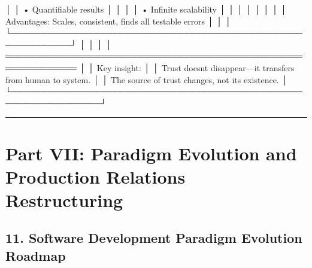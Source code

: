 \documentclass[
]{article}
\newenvironment{Shaded}{}{}
\newcommand{\NormalTok}[1]{#1}
\begin{document}
\begin{Shaded}
\begin{Highlighting}[]
\NormalTok{│  │              • Quantifiable results                        │ │}
\NormalTok{│  │              • Infinite scalability                        │ │}
\NormalTok{│  │                                                            │ │}
\NormalTok{│  │  Advantages: Scales, consistent, finds all testable errors │ │}
\NormalTok{│  └────────────────────────────────────────────────────────────┘ │}
\NormalTok{│                                                                  │}
\NormalTok{│  ══════════════════════════════════════════════════════════════  │}
\NormalTok{│  Key insight:                                                   │}
\NormalTok{│  Trust doesn\textquotesingle{}t disappear—it transfers from human to system.    │}
\NormalTok{│  The source of trust changes, not its existence.               │}
\NormalTok{└─────────────────────────────────────────────────────────────────┘}
\end{Highlighting}
\end{Shaded}

\begin{center}\rule{0.5\linewidth}{0.5pt}\end{center}

\hypertarget{part-vii-paradigm-evolution-and-production-relations-restructuring}{%
\section{Part VII: Paradigm Evolution and Production Relations
Restructuring}\label{part-vii-paradigm-evolution-and-production-relations-restructuring}}

\hypertarget{11-software-development-paradigm-evolution-roadmap}{%
\subsection{11. Software Development Paradigm Evolution
Roadmap}\label{11-software-development-paradigm-evolution-roadmap}}
\end{document}

